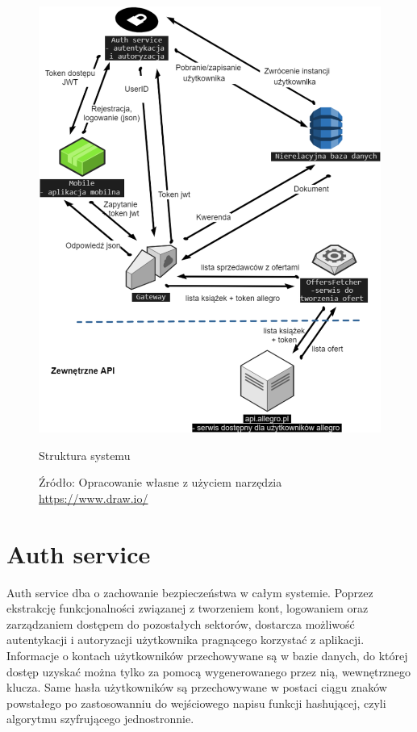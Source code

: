 \begin{figure}[H]
	\centering
	\includegraphics[width=\linewidth]{architecture_overview.pdf}
	\caption{\centering Struktura systemu}
	\caption*{\centering Źródło: {Opracowanie własne z użyciem narzędzia \url{https://www.draw.io/}}}
\end{figure}

\section{Auth service}
Auth service dba o zachowanie bezpieczeństwa w całym systemie.
Poprzez ekstrakcję funkcjonalności związanej z tworzeniem kont, logowaniem oraz zarządzaniem dostępem do pozostałych sektorów, dostarcza możliwość autentykacji i autoryzacji użytkownika pragnącego korzystać z aplikacji.
Informacje o kontach użytkowników przechowywane są w bazie danych, do której dostęp uzyskać można tylko za pomocą wygenerowanego przez nią, wewnętrznego klucza. Same hasła użytkowników są przechowywane w postaci ciągu znaków powstałego po zastosowanniu do wejściowego napisu funkcji hashującej, czyli algorytmu szyfrującego jednostronnie.

